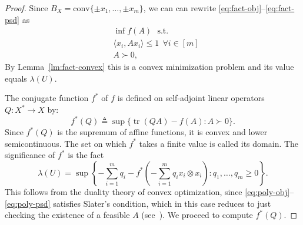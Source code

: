 \documentclass[11pt]{article}
\newcommand{\eqdef}{\triangleq}
\DeclareMathOperator{\tr}{tr}
\begin{document}
\dual*
\begin{proof}%
  Since $B_X = \mathrm{conv}\{\pm x_1, \ldots, \pm x_m\}$, we can can
  rewrite \eqref{eq:fact-obj}--\eqref{eq:fact-psd} as
  \begin{align}
    &\inf f(A)\ \ \ 
    \text{s.t.}\label{eq:poly-obj}\\
    &\langle x_i, Ax_i\rangle \le 1 \ \ \forall i \in [m]\\
    &A \succ 0\label{eq:poly-psd},
  \end{align}
  By Lemma~\ref{lm:fact-convex} this is a convex minimization problem
  and its value equals $\lambda(U)$.

  The conjugate function $f^*$ of $f$ is defined on self-adjoint
  linear operators $Q:X^* \to X$ by:
  \[
  f^*(Q) \eqdef \sup\{\tr(QA) - f(A): A \succ 0\}.
  \]
  Since $f^*(Q)$ is the supremum of affine functions, it is convex and
  lower semicontinuous. The set on which $f^*$ takes a finite value is
  called its domain. The significance of $f^*$ is the fact
  \begin{equation}\label{eq:lagrange}
  \lambda(U) = 
  \sup\left\{-\sum_{i = 1}^m{q_i} - 
    f^*\left(-\sum_{i = 1}^m{q_i x_i\otimes x_i}\right):
      q_1, \ldots, q_m \ge 0\right\}.
  \end{equation}
  This follows from the duality theory of convex optimization, since
  \eqref{eq:poly-obj}--\eqref{eq:poly-psd} satisfies Slater's
  condition, which in this case reduces to just checking the existence
  of a feasible $A$ (see~\cite[Chapter 5]{BoydV04}). We proceed to
  compute $f^*(Q)$.


\end{proof}
\end{document}
